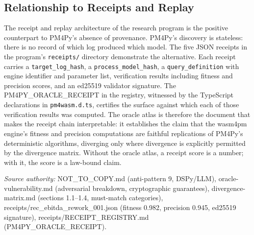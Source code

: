 \subsection{Relationship to Receipts and Replay}
\label{sec:sources-pm4py-lineage-receipts}

The receipt and replay architecture of the research program is the positive counterpart
to PM4Py's absence of provenance. PM4Py's discovery is stateless: there is no record
of which log produced which model. The five JSON receipts in the program's
\texttt{receipts/} directory demonstrate the alternative. Each receipt carries a
\texttt{target\_log\_hash}, a \texttt{process\_model\_hash}, a \texttt{query\_definition}
with engine identifier and parameter list, verification results including fitness and
precision scores, and an ed25519 validator signature. The PM4PY\_ORACLE\_RECEIPT in the
registry, witnessed by the TypeScript declarations in \texttt{pm4wasm.d.ts}, certifies
the surface against which each of those verification results was computed. The oracle
atlas is therefore the document that makes the receipt chain interpretable: it establishes
the claim that the wasm4pm engine's fitness and precision computations are faithful
replications of PM4Py's deterministic algorithms, diverging only where divergence is
explicitly permitted by the divergence matrix. Without the oracle atlas, a receipt score
is a number; with it, the score is a law-bound claim.

\bigskip
\noindent\textit{Source authority:} NOT\_TO\_COPY.md (anti-pattern 9, DSPy/LLM),
oracle-vulnerability.md (adversarial breakdown, cryptographic guarantees),
divergence-matrix.md (sections 1.1--1.4, must-match categories),
receipts/rec\_ebitda\_rework\_001.json (fitness 0.982, precision 0.945, ed25519
signature), receipts/RECEIPT\_REGISTRY.md (PM4PY\_ORACLE\_RECEIPT).
